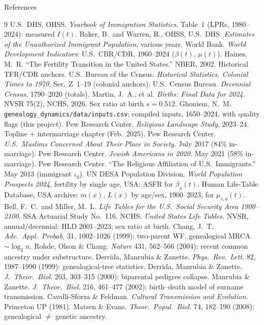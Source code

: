 \documentclass[10pt]{beamer}
\begin{document}
\begin{frame}{References}
  \tiny
  \begin{thebibliography}{9}
  U.S.\ DHS, OHSS. \textit{Yearbook of Immigration Statistics}, Table~1 (LPRs, 1980--2024): measured $I(t)$.
  Baker, B.\ and Warren, R., OHSS, U.S.\ DHS. \textit{Estimates of the Unauthorized Immigrant Population}, various years.
  World Bank. \textit{World Development Indicators}: U.S.\ CBR/CDR, 1960--2024 ($\beta(t)$, $\mu(t)$).
  Haines, M.~R. ``The Fertility Transition in the United States.'' NBER, 2002. Historical TFR/CDR anchors.
  U.S.\ Bureau of the Census. \textit{Historical Statistics, Colonial Times to 1970}, Ser.\ Z~1--19 (colonial anchors).
  U.S.\ Census Bureau. \textit{Decennial Census}, 1790--2020 (totals).
  Martin, J.~A., et al. \textit{Births: Final Data for 2024.} NVSR 75(2), NCHS, 2026. Sex ratio at birth $s{=}0.512$.
  Ghoniem, N.~M. \texttt{genealogy\_dynamics/data/inputs.csv}: compiled inputs, 1650--2024, with quality flags (this project).
  Pew Research Center. \textit{Religious Landscape Study}, 2023--24. Topline + intermarriage chapter (Feb.\ 2025).
  Pew Research Center. \textit{U.S.\ Muslims Concerned About Their Place in Society.} July 2017 (84\% in-marriage).
  Pew Research Center. \textit{Jewish Americans in 2020.} May 2021 (58\% in-marriage).
  Pew Research Center. ``The Religious Affiliation of U.S.\ Immigrants.'' May 2013 (immigrant $\iota_g$).
  UN DESA Population Division. \textit{World Population Prospects 2024}, fertility by single age, USA: ASFR for $\beta_a(t)$.
  Human Life-Table Database, USA archive: $m(x)$, $L(x)$ by age/sex, 1900--2023, for $\mu_{s,a}(t)$.
  Bell, F.~C.\ and Miller, M.~L. \textit{Life Tables for the U.S.\ Social Security Area 1900--2100.} SSA Actuarial Study No.~116.
  NCHS. \textit{United States Life Tables.} NVSR, annual/decennial: HLD 2001--2023; sex ratio at birth.
  Chang, J.~T. \textit{Adv.\ Appl.\ Probab.} 31, 1002--1026 (1999): two-parent WF, genealogical MRCA $\sim\!\log_2 n$.
  Rohde, Olson \& Chang. \textit{Nature} 431, 562--566 (2004): recent common ancestry under substructure.
  Derrida, Manrubia \& Zanette. \textit{Phys.\ Rev.\ Lett.} 82, 1987--1990 (1999): genealogical-tree statistics.
  Derrida, Manrubia \& Zanette. \textit{J.\ Theor.\ Biol.} 203, 303--315 (2000): biparental pedigree collapse.
  Manrubia \& Zanette. \textit{J.\ Theor.\ Biol.} 216, 461--477 (2002): birth--death model of surname transmission.
  Cavalli-Sforza \& Feldman. \textit{Cultural Transmission and Evolution.} Princeton UP (1981).
  Matsen \& Evans. \textit{Theor.\ Popul.\ Biol.} 74, 182--190 (2008): genealogical $\ne$ genetic ancestry.
  \end{thebibliography}
\end{frame}
\end{document}
